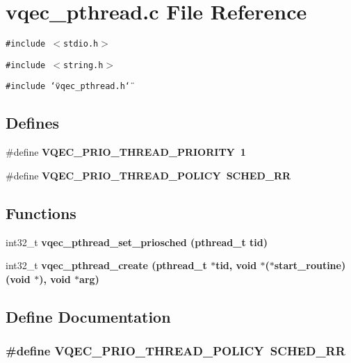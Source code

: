 \section{vqec\_\-pthread.c File Reference}
\label{vqec__pthread_8c}
{\tt \#include $<$stdio.h$>$}\par
{\tt \#include $<$string.h$>$}\par
{\tt \#include \char`\"{}vqec\_\-pthread.h\char`\"{}}\par
\subsection*{Defines}
\begin{CompactItemize}
\item 
\#define \bf{VQEC\_\-PRIO\_\-THREAD\_\-PRIORITY}~1
\item 
\#define \bf{VQEC\_\-PRIO\_\-THREAD\_\-POLICY}~SCHED\_\-RR
\end{CompactItemize}
\subsection*{Functions}
\begin{CompactItemize}
\item 
int32\_\-t \bf{vqec\_\-pthread\_\-set\_\-priosched} (pthread\_\-t tid)
\item 
int32\_\-t \bf{vqec\_\-pthread\_\-create} (pthread\_\-t $\ast$tid, void $\ast$($\ast$start\_\-routine)(void $\ast$), void $\ast$arg)
\end{CompactItemize}


\subsection{Define Documentation}
\subsubsection{\setlength{\rightskip}{0pt plus 5cm}\#define VQEC\_\-PRIO\_\-THREAD\_\-POLICY~SCHED\_\-RR}\label{vqec__pthread_8c_7721ac05de68044794076ff0f84c99ad}


